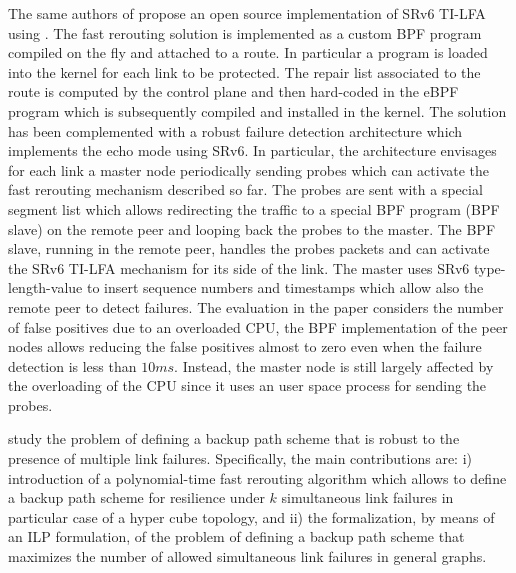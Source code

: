 The same authors of \cite{xhonneux2018leveraging} propose an open source implementation of SRv6 TI-LFA  using . The fast rerouting solution is implemented as a custom BPF program compiled on the fly and attached to a route. In particular a program is loaded into the kernel for each link to be protected. The repair list associated to the route is computed by the control plane and then hard-coded in the eBPF program which is subsequently compiled and installed in the kernel. The solution has been complemented with a robust failure detection architecture which implements the  echo mode using SRv6. In particular, the architecture envisages for each link a master node periodically sending probes which can activate the fast rerouting mechanism described so far. 
The probes are sent with a special segment list which allows redirecting the traffic to a special BPF program (BPF slave) on the remote peer and looping back the probes to the master. The BPF slave, running in the remote peer, handles the probes packets and can activate the SRv6 TI-LFA mechanism for its side of the link. The master uses SRv6 type-length-value to insert sequence numbers and timestamps which allow also the remote peer to detect failures. The evaluation in the paper considers the number of false positives due to an overloaded CPU, the BPF implementation of the peer nodes allows reducing the false positives almost to zero even when the failure detection is less than $10ms$. Instead, the master node is still largely affected by the overloading of the CPU since it uses an user space process for sending the probes.

\cite{foerster2018local} study the problem of defining a backup path scheme that is robust to the presence of multiple link failures. 
Specifically, the main contributions are: i) introduction of a polynomial-time fast rerouting algorithm which allows to define a backup path scheme for resilience under $k$ simultaneous link failures in particular case of a hyper cube topology, and ii) the formalization, by means of an ILP formulation, of the problem of defining a backup path scheme that maximizes the number of allowed simultaneous link failures in general graphs.


